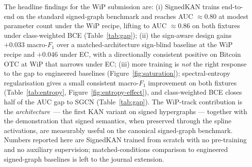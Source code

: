 \smallskip
The headline findings for the WiP submission are: (i) SignedKAN
trains end-to-end on the standard signed-graph benchmark and
reaches AUC $\approx\!0.80$ at modest parameter count under the
WiP recipe, lifting to AUC $\approx\!0.86$ on both fixtures
under class-weighted BCE (Table~\ref{tab:gap}); (ii) the
sign-aware design gains $+0.033$ macro-$F_1$ over a
matched-architecture sign-blind baseline at the WiP recipe and
$+0.046$ under EC, with a directionally consistent
positive on Bitcoin OTC at WiP that narrows under EC; (iii) more
training is \emph{not} the right response to the gap to engineered
baselines (Figure~\ref{fig:saturation}); spectral-entropy
regularisation gives a small consistent macro-$F_1$ improvement
on both fixtures (Table~\ref{tab:entropy},
Figure~\ref{fig:entropy-effect}), and class-weighted BCE closes
half of the AUC gap to SGCN (Table~\ref{tab:gap}). The
WiP-track contribution is the \emph{architecture}~--- the first
KAN variant on signed hypergraphs --- together with the
demonstration that signed semantics, when preserved through
the spline activations, are measurably useful on the canonical
signed-graph benchmark. Numbers reported here are SignedKAN
trained from scratch with no pre-training and no auxiliary
supervision; matched-conditions comparison to engineered
signed-graph baselines is left to the journal extension.
